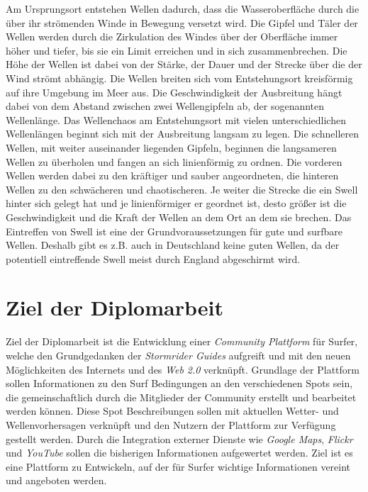 Am Ursprungsort entstehen Wellen dadurch, dass die Wasseroberfläche
durch die über ihr strömenden Winde in Bewegung versetzt wird. Die
Gipfel und Täler der Wellen werden durch die Zirkulation des Windes
über der Oberfläche immer höher und tiefer, bis sie ein Limit
erreichen und in sich zusammenbrechen. Die Höhe der Wellen ist dabei
von der Stärke, der Dauer und der Strecke über die der Wind strömt
abhängig. Die Wellen breiten sich vom Entstehungsort kreisförmig auf
ihre Umgebung im Meer aus. Die Geschwindigkeit der Ausbreitung hängt
dabei von dem Abstand zwischen zwei Wellengipfeln ab, der sogenannten
Wellenlänge. Das Wellenchaos am Entstehungsort mit vielen
unterschiedlichen Wellenlängen beginnt sich mit der Ausbreitung
langsam zu legen. Die schnelleren Wellen, mit weiter auseinander
liegenden Gipfeln, beginnen die langsameren Wellen zu überholen und
fangen an sich linienförmig zu ordnen. Die vorderen Wellen werden
dabei zu den kräftiger und sauber angeordneten, die hinteren Wellen zu
den schwächeren und chaotischeren. Je weiter die Strecke die ein Swell
hinter sich gelegt hat und je linienförmiger er geordnet ist, desto
größer ist die Geschwindigkeit und die Kraft der Wellen an dem Ort an
dem sie brechen. Das Eintreffen von Swell ist eine der
Grundvoraussetzungen für gute und surfbare Wellen. Deshalb gibt es
z.B. auch in Deutschland keine guten Wellen, da der potentiell
eintreffende Swell meist durch England abgeschirmt wird.

\section{Ziel der Diplomarbeit}
Ziel der Diplomarbeit ist die Entwicklung einer \textit{Community
  Plattform} für Surfer, welche den Grundgedanken der
\textit{Stormrider Guides} aufgreift und mit den neuen Möglichkeiten
des Internets und des \textit{Web 2.0} verknüpft. Grundlage der
Plattform sollen Informationen zu den Surf Bedingungen an den
verschiedenen Spots sein, die gemeinschaftlich durch die Mitglieder
der Community erstellt und bearbeitet werden können. Diese Spot
Beschreibungen sollen mit aktuellen Wetter- und Wellenvorhersagen
verknüpft und den Nutzern der Plattform zur Verfügung gestellt
werden. Durch die Integration externer Dienste wie \textit{Google
  Maps}, \textit{Flickr} und \textit{YouTube} sollen die bisherigen
Informationen aufgewertet werden. Ziel ist es eine Plattform zu
Entwickeln, auf der für Surfer wichtige Informationen vereint und
angeboten werden.

